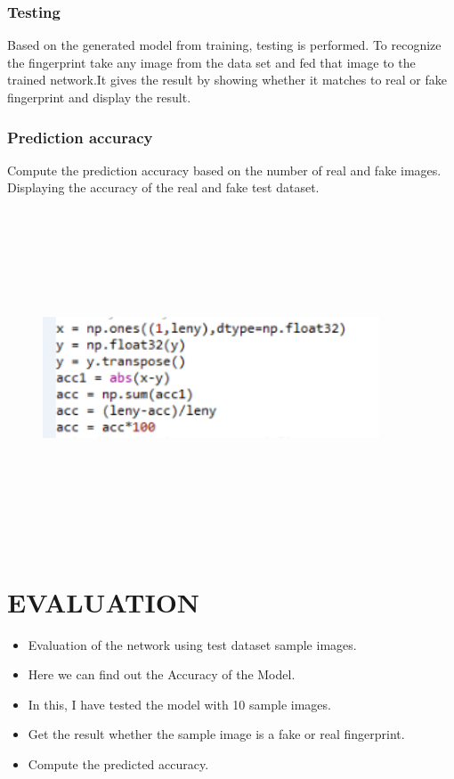 \documentclass[a4paper,12pt,oneside]{article}
\begin{document}
\subsubsection{Testing}
 Based on the generated model from training, testing is performed.
 To recognize the fingerprint take any image from the data set and
fed that image to the trained network.It gives the result by showing whether it matches to real or fake fingerprint and display the result.


\subsubsection{Prediction accuracy}
Compute the prediction accuracy based on the number of real and fake
images. Displaying the accuracy of the real and fake test dataset.

\begin{figure}[H]
\centering
\includegraphics[height=10cm,width=10cm]{pred.PNG}
\end{figure}





\newpage
\section{EVALUATION}
\begin{itemize}
    \item Evaluation of the network using test dataset sample images.
\item Here we can find out the Accuracy of the Model.
\item In this, I have tested the model with 10 sample images.
\item Get the result whether the sample image is a fake or real fingerprint.
\item Compute the predicted accuracy.
 
    
    
\end{itemize}
\end{document}
